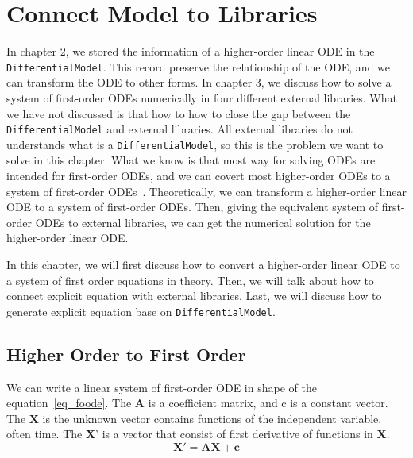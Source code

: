 \chapter{Connect Model to Libraries}
In chapter 2, we stored the information of a higher-order linear ODE in the \verb|DifferentialModel|. This record preserve the relationship of the ODE, and we can transform the ODE to other forms. In chapter 3, we discuss how to solve a system of first-order ODEs numerically in four different external libraries. What we have not discussed is that how to how to close the gap between the \verb|DifferentialModel| and external libraries. All external libraries do not understands what is a \verb|DifferentialModel|, so this is the problem we want to solve in this chapter. What we know is that most way for solving ODEs are intended for first-order ODEs, and we can covert most higher-order ODEs to a system of first-order ODEs~\citep{converthigherode}. 
Theoretically, we can transform a higher-order linear ODE to a system of first-order ODEs. Then, giving the equivalent system of first-order ODEs to external libraries, we can get the numerical solution for the higher-order linear ODE.

In this chapter, we will first discuss how to convert a higher-order linear ODE to a system of first order equations in theory. Then, we will talk about how to connect explicit equation with external libraries. Last, we will discuss how to generate explicit equation base on \verb|DifferentialModel|.

\section{Higher Order to First Order}
We can write a linear system of first-order ODE in shape of the equation~\ref{eq_foode}. The \textbf{A} is a coefficient matrix, and c is a constant vector. The \textbf{X} is the unknown vector contains functions of the independent variable, often time. The \textbf{X}' is a vector that consist of first derivative of functions in \textbf{X}.
\begin{equation} \label{eq_foode}
    \boldsymbol{X}' = \boldsymbol{AX} + \boldsymbol{c}
\end{equation}


